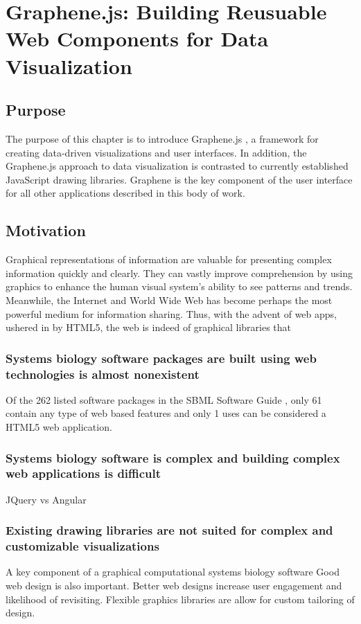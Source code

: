 \chapter{Graphene.js: Building Reusuable Web Components for Data Visualization}

\section{Purpose}

The purpose of this chapter is to introduce Graphene.js \autocite{gu2014graphene}, a framework for creating data-driven visualizations and user interfaces.
In addition, the Graphene.js approach to data visualization is contrasted to currently established JavaScript drawing libraries.
Graphene is the key component of the user interface for all other applications described in this body of work.

\section{Motivation}

Graphical representations of information are valuable for presenting complex information quickly and clearly. \autocite{newsom2007public, smiciklas2012power}
They can vastly improve comprehension by using graphics to enhance the human visual system’s ability to see patterns and trends. \autocite{heer2010tour, sears2007human}
Meanwhile, the Internet and World Wide Web \autocite{berners2000weaving} has become perhaps the most powerful medium for information sharing. \autocite{bollacker1998citeseer, wilkinson2003motivations, page1999pagerank}
Thus, with the advent of web apps, ushered in by HTML5, the web is indeed of graphical libraries that 

\subsection{Systems biology software packages are built using web technologies is almost nonexistent}
Of the 262 listed software packages in the SBML Software Guide \autocite{sbml2014software}, only 61 contain any type of web based features and only 1 uses can be considered a HTML5 web application.
\subsection{Systems biology software is complex and building complex web applications is difficult}
JQuery vs Angular
\subsection{Existing drawing libraries are not suited for complex and customizable visualizations}
A key component of a graphical computational systems biology software
Good web design is also important.
Better web designs increase user engagement and likelihood of revisiting. \autocite{rosen2004website}
Flexible graphics libraries are allow for custom tailoring of design.

